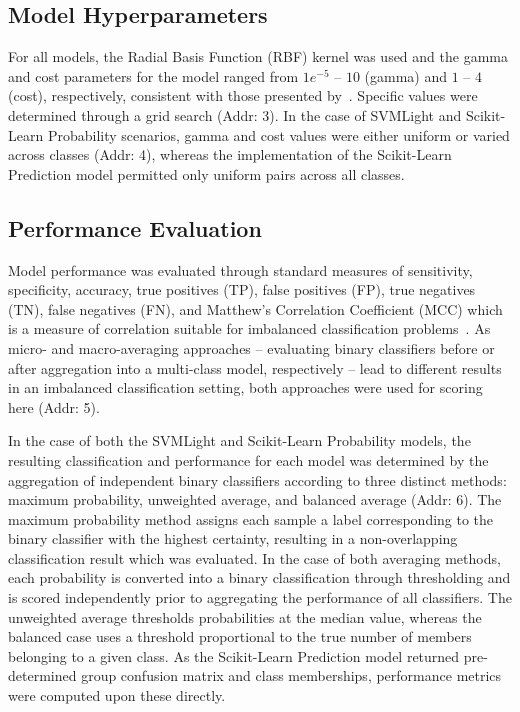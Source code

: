 \subsection{Model Hyperparameters}
For all models, the Radial Basis Function (RBF) kernel was used and the gamma and cost parameters for the model ranged
from $1e^{-5}$ -- $10$ (gamma) and $1$ -- $4$ (cost), respectively, consistent with those presented by~\cite{mishra_prediction_2014}.
Specific values were determined through a grid search (Addr: 3). In the case of SVMLight and Scikit-Learn Probability
scenarios, gamma and cost values were either uniform or varied across classes (Addr: 4), whereas the implementation of
the Scikit-Learn Prediction model permitted only uniform pairs across all classes.

\subsection{Performance Evaluation}
Model performance was evaluated through standard measures of sensitivity, specificity, accuracy, true positives (TP),
false positives (FP), true negatives (TN), false negatives (FN), and Matthew's Correlation Coefficient (MCC) which is a
measure of correlation suitable for imbalanced classification problems~\cite{mcc2017optimal}. As micro- and
macro-averaging approaches -- evaluating binary classifiers before or after aggregation into a multi-class model,
respectively -- lead to different results in an imbalanced classification setting, both approaches were used for
scoring here (Addr: 5).

In the case of both the SVMLight and Scikit-Learn Probability models, the resulting classification and performance for each
model was determined by the aggregation of independent binary classifiers according to three distinct methods: maximum
probability, unweighted average, and balanced average (Addr: 6). The maximum probability method assigns each sample a
label corresponding to the binary classifier with the highest certainty, resulting in a non-overlapping classification
result which was evaluated. In the case of both averaging methods, each probability is converted into a binary
classification through thresholding and is scored independently prior to aggregating the performance of all classifiers.
The unweighted average thresholds probabilities at the median value, whereas the balanced case uses a threshold
proportional to the true number of members belonging to a given class. As the Scikit-Learn Prediction model returned
pre-determined group confusion matrix and class memberships, performance metrics were computed upon these directly.

